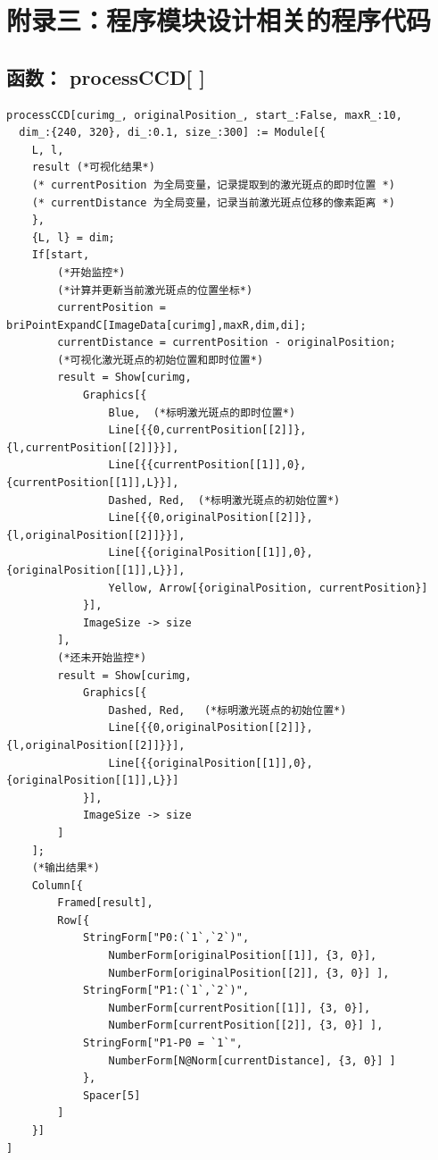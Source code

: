\documentclass[UTF8,a4paper,12pt]{article}
\begin{document}
\section{附录三：程序模块设计相关的程序代码}

\subsection{函数： processCCD[ ]}
\begin{verbatim}
processCCD[curimg_, originalPosition_, start_:False, maxR_:10,
  dim_:{240, 320}, di_:0.1, size_:300] := Module[{
    L, l,
    result (*可视化结果*)
    (* currentPosition 为全局变量，记录提取到的激光斑点的即时位置 *)
    (* currentDistance 为全局变量，记录当前激光斑点位移的像素距离 *)
    },
    {L, l} = dim;
    If[start,
        (*开始监控*)
        (*计算并更新当前激光斑点的位置坐标*)
        currentPosition = briPointExpandC[ImageData[curimg],maxR,dim,di];
        currentDistance = currentPosition - originalPosition;
        (*可视化激光斑点的初始位置和即时位置*)
        result = Show[curimg,
            Graphics[{
                Blue,  (*标明激光斑点的即时位置*)
                Line[{{0,currentPosition[[2]]},{l,currentPosition[[2]]}}],
                Line[{{currentPosition[[1]],0},{currentPosition[[1]],L}}],
                Dashed, Red,  (*标明激光斑点的初始位置*)
                Line[{{0,originalPosition[[2]]},{l,originalPosition[[2]]}}],
                Line[{{originalPosition[[1]],0},{originalPosition[[1]],L}}],
                Yellow, Arrow[{originalPosition, currentPosition}]
            }],
            ImageSize -> size
        ],
        (*还未开始监控*)
        result = Show[curimg,
            Graphics[{
                Dashed, Red,   (*标明激光斑点的初始位置*)
                Line[{{0,originalPosition[[2]]},{l,originalPosition[[2]]}}],
                Line[{{originalPosition[[1]],0},{originalPosition[[1]],L}}]
            }],
            ImageSize -> size
        ]
    ];
    (*输出结果*)
    Column[{
        Framed[result],
        Row[{
            StringForm["P0:(`1`,`2`)", 
                NumberForm[originalPosition[[1]], {3, 0}],
                NumberForm[originalPosition[[2]], {3, 0}] ],
            StringForm["P1:(`1`,`2`)", 
                NumberForm[currentPosition[[1]], {3, 0}],
                NumberForm[currentPosition[[2]], {3, 0}] ],
            StringForm["P1-P0 = `1`", 
                NumberForm[N@Norm[currentDistance], {3, 0}] ]
            }, 
            Spacer[5]
        ]
    }]
]
\end{verbatim}
\end{document}
